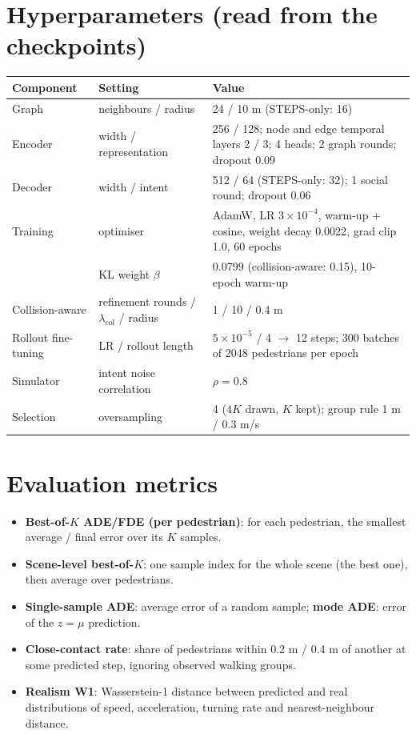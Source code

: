 \documentclass[10pt]{article}
\begin{document}
\section{Hyperparameters (read from the checkpoints)}
\begin{tabularx}{\textwidth}{@{}l l X@{}}
\toprule
Component & Setting & Value \\
\midrule
Graph & neighbours / radius & 24 / 10 m (STEPS-only: 16) \\
Encoder & width / representation & 256 / 128; node and edge temporal layers 2 / 3; 4 heads; 2 graph rounds; dropout 0.09 \\
Decoder & width / intent & 512 / 64 (STEPS-only: 32); 1 social round; dropout 0.06 \\
Training & optimiser & AdamW, LR $3\times10^{-4}$, warm-up + cosine, weight decay 0.0022, grad clip 1.0, 60 epochs \\
& KL weight $\beta$ & 0.0799 (collision-aware: 0.15), 10-epoch warm-up \\
Collision-aware & refinement rounds / $\lambda_{\text{col}}$ / radius & 1 / 10 / 0.4 m \\
Rollout fine-tuning & LR / rollout length & $5\times10^{-5}$ / 4 $\to$ 12 steps; 300 batches of 2048 pedestrians per epoch \\
Simulator & intent noise correlation & $\rho=0.8$ \\
Selection & oversampling & 4 ($4K$ drawn, $K$ kept); group rule 1 m / 0.3 m/s \\
\bottomrule
\end{tabularx}

\section{Evaluation metrics}
\begin{itemize}
\item \textbf{Best-of-$K$ ADE/FDE (per pedestrian)}: for each pedestrian, the smallest average / final error over its $K$ samples.
\item \textbf{Scene-level best-of-$K$}: one sample index for the whole scene (the best one), then average over pedestrians.
\item \textbf{Single-sample ADE}: average error of a random sample; \textbf{mode ADE}: error of the $z=\mu$ prediction.
\item \textbf{Close-contact rate}: share of pedestrians within 0.2 m / 0.4 m of another at some predicted step, ignoring observed walking groups.
\item \textbf{Realism W1}: Wasserstein-1 distance between predicted and real distributions of speed, acceleration, turning rate and nearest-neighbour distance.
\end{itemize}
\end{document}
